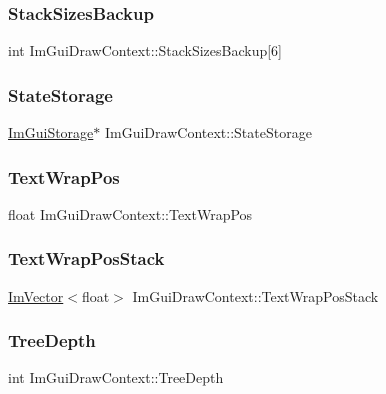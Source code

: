 \subsubsection{\texorpdfstring{Stack\+Sizes\+Backup}{StackSizesBackup}}
{\footnotesize\ttfamily int Im\+Gui\+Draw\+Context\+::\+Stack\+Sizes\+Backup\mbox{[}6\mbox{]}}

\hypertarget{struct_im_gui_draw_context_a507947c789f377ba13767061557fd348}{}\label{struct_im_gui_draw_context_a507947c789f377ba13767061557fd348} 
\subsubsection{\texorpdfstring{State\+Storage}{StateStorage}}
{\footnotesize\ttfamily \hyperlink{struct_im_gui_storage}{Im\+Gui\+Storage}$\ast$ Im\+Gui\+Draw\+Context\+::\+State\+Storage}

\hypertarget{struct_im_gui_draw_context_a0488b6a84b2f26ddd536fef2ae3f96c3}{}\label{struct_im_gui_draw_context_a0488b6a84b2f26ddd536fef2ae3f96c3} 
\subsubsection{\texorpdfstring{Text\+Wrap\+Pos}{TextWrapPos}}
{\footnotesize\ttfamily float Im\+Gui\+Draw\+Context\+::\+Text\+Wrap\+Pos}

\hypertarget{struct_im_gui_draw_context_ac282b2f910a8846f4c200c358974b12a}{}\label{struct_im_gui_draw_context_ac282b2f910a8846f4c200c358974b12a} 
\subsubsection{\texorpdfstring{Text\+Wrap\+Pos\+Stack}{TextWrapPosStack}}
{\footnotesize\ttfamily \hyperlink{class_im_vector}{Im\+Vector}$<$float$>$ Im\+Gui\+Draw\+Context\+::\+Text\+Wrap\+Pos\+Stack}

\hypertarget{struct_im_gui_draw_context_a08d8578fe382425a67b4f5e5257b5436}{}\label{struct_im_gui_draw_context_a08d8578fe382425a67b4f5e5257b5436} 
\subsubsection{\texorpdfstring{Tree\+Depth}{TreeDepth}}
{\footnotesize\ttfamily int Im\+Gui\+Draw\+Context\+::\+Tree\+Depth}

